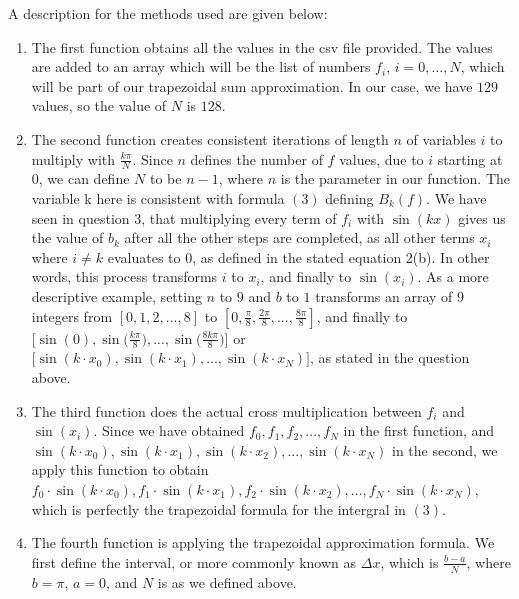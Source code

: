 

A description for the methods used are given below:

\begin{enumerate}
\item The first function obtains all the values in the csv file provided. 
The values are added to an array which will be the list of numbers $f_i$, $i=0,\ldots,N$, which will be part of our trapezoidal sum approximation. 
In our case, we have $129$ values, so the value of $N$ is $128$.
\item The second function creates consistent iterations of length $n$ of variables $i$ to multiply with $\frac{k\pi}{N}$. 
Since $n$ defines the number of $f$ values, due to $i$ starting at $0$, we can define $N$ to be $n-1$, where $n$ is the parameter in our function. 
The variable k here is consistent with formula $(3)$ defining $B_k(f)$. 
We have seen in question $3$, that multiplying every term of $f_i$ with $\sin(kx)$ gives us the value of $b_k$ after all the other steps are completed, 
as all other terms $x_i$ where $i \neq k$ evaluates to $0$, as defined in the stated equation 2(b). 
In other words, this process transforms $i$ to $x_i$, and finally to $\sin(x_i)$.
\newline
As a more descriptive example, setting $n$ to $9$ and $b$ to $1$ transforms an array of $9$ integers
\vspace{0.05cm}
\newline
from $[0, 1, 2, ..., 8]$ to $[0, \frac{\pi}{8}, \frac{2\pi}{8}, ..., \frac{8\pi}{8}]$, 
and finally to $\bigg[\sin(0), \sin\bigg(\frac{k\pi}{8}\bigg), ..., 
\sin\bigg(\frac{8k\pi}{8}\bigg)\bigg]$ or $\bigg[\sin(k \cdot x_0), 
\sin(k \cdot x_1), ..., \sin(k \cdot x_N)\bigg]$, as stated in the question above.
\item The third function does the actual cross multiplication between $f_i$ and $\sin(x_i)$. 
Since we have obtained $f_0, f_1, f_2, ..., f_N$ in the first function, and $\sin(k \cdot x_0), 
\sin(k \cdot x_1), \sin(k \cdot x_2), ..., \sin(k \cdot x_N)$ in the second, 
we apply this function to obtain $f_0 \cdot \sin(k \cdot x_0), f_1 \cdot \sin(k \cdot x_1), 
f_2 \cdot \sin(k \cdot x_2), ..., f_N \cdot \sin(k \cdot x_N)$, which is perfectly the trapezoidal formula for the intergral in $(3)$.
\item The fourth function is applying the trapezoidal approximation formula. 
We first define the interval, or more commonly known as $\Delta x$, which is $\frac{b-a}{N}$, where $b = \pi$, $a = 0$, and $N$ is as we defined above.

\end{enumerate}

